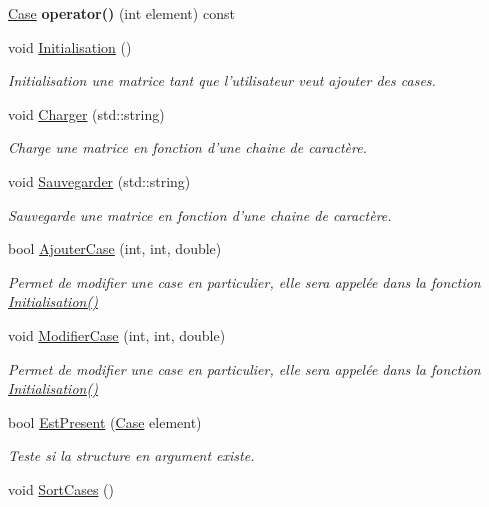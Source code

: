 \begin{DoxyCompactItemize}
\item 
\hypertarget{classMatrice_af2c2f32b3d8199af19dfbf296d54b6c7}{\hyperlink{structCase}{Case} {\bfseries operator()} (int element) const }\label{classMatrice_af2c2f32b3d8199af19dfbf296d54b6c7}

\item 
\hypertarget{classMatrice_af2e5ed60f4d4ccbbc16140fa4e4d0ef0}{void \hyperlink{classMatrice_af2e5ed60f4d4ccbbc16140fa4e4d0ef0}{Initialisation} ()}\label{classMatrice_af2e5ed60f4d4ccbbc16140fa4e4d0ef0}

\begin{DoxyCompactList}\small\item\em Initialisation une matrice tant que l'utilisateur veut ajouter des cases. \end{DoxyCompactList}\item 
void \hyperlink{classMatrice_ab1cf951124693247bc59fcf7a5649b3c}{Charger} (std\-::string)
\begin{DoxyCompactList}\small\item\em Charge une matrice en fonction d'une chaine de caractère. \end{DoxyCompactList}\item 
void \hyperlink{classMatrice_ada819efc5f484ea7f41bfe9f79c77694}{Sauvegarder} (std\-::string)
\begin{DoxyCompactList}\small\item\em Sauvegarde une matrice en fonction d'une chaine de caractère. \end{DoxyCompactList}\item 
bool \hyperlink{classMatrice_a8af31f6f88fa6fb2be45687b221286d1}{Ajouter\-Case} (int, int, double)
\begin{DoxyCompactList}\small\item\em Permet de modifier une case en particulier, elle sera appelée dans la fonction \hyperlink{classMatrice_af2e5ed60f4d4ccbbc16140fa4e4d0ef0}{Initialisation()} \end{DoxyCompactList}\item 
void \hyperlink{classMatrice_ad43a0aff1d4a0867c5a7a41578379429}{Modifier\-Case} (int, int, double)
\begin{DoxyCompactList}\small\item\em Permet de modifier une case en particulier, elle sera appelée dans la fonction \hyperlink{classMatrice_af2e5ed60f4d4ccbbc16140fa4e4d0ef0}{Initialisation()} \end{DoxyCompactList}\item 
bool \hyperlink{classMatrice_a57bd41fe4dc7b130c7c808d35f2c11f1}{Est\-Present} (\hyperlink{structCase}{Case} element)
\begin{DoxyCompactList}\small\item\em Teste si la structure en argument existe. \end{DoxyCompactList}\item 
\hypertarget{classMatrice_a8134f1da15692ce66fd026b9333eb1e0}{void \hyperlink{classMatrice_a8134f1da15692ce66fd026b9333eb1e0}{Sort\-Cases} ()}\label{classMatrice_a8134f1da15692ce66fd026b9333eb1e0}


\end{DoxyCompactItemize}
